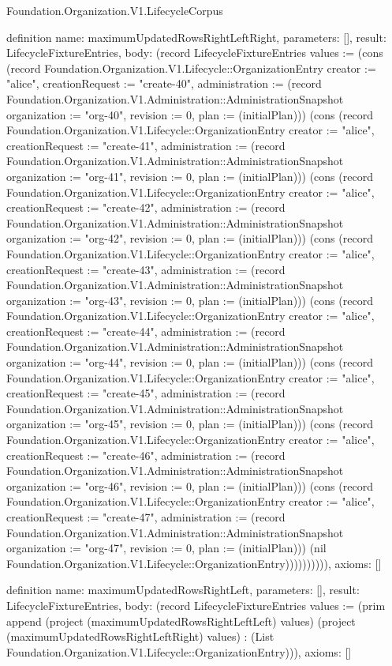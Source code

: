 \begin{lexlean}{Foundation.Organization.V1.LifecycleCorpus}
\begin{semanticmodule}
definition{
  name: maximumUpdatedRowsRightLeftRight,
  parameters: [],
  result: LifecycleFixtureEntries,
  body: (record LifecycleFixtureEntries {values := (cons (record Foundation.Organization.V1.Lifecycle::OrganizationEntry {creator := "alice", creationRequest := "create-40", administration := (record Foundation.Organization.V1.Administration::AdministrationSnapshot {organization := "org-40", revision := 0, plan := (initialPlan)})}) (cons (record Foundation.Organization.V1.Lifecycle::OrganizationEntry {creator := "alice", creationRequest := "create-41", administration := (record Foundation.Organization.V1.Administration::AdministrationSnapshot {organization := "org-41", revision := 0, plan := (initialPlan)})}) (cons (record Foundation.Organization.V1.Lifecycle::OrganizationEntry {creator := "alice", creationRequest := "create-42", administration := (record Foundation.Organization.V1.Administration::AdministrationSnapshot {organization := "org-42", revision := 0, plan := (initialPlan)})}) (cons (record Foundation.Organization.V1.Lifecycle::OrganizationEntry {creator := "alice", creationRequest := "create-43", administration := (record Foundation.Organization.V1.Administration::AdministrationSnapshot {organization := "org-43", revision := 0, plan := (initialPlan)})}) (cons (record Foundation.Organization.V1.Lifecycle::OrganizationEntry {creator := "alice", creationRequest := "create-44", administration := (record Foundation.Organization.V1.Administration::AdministrationSnapshot {organization := "org-44", revision := 0, plan := (initialPlan)})}) (cons (record Foundation.Organization.V1.Lifecycle::OrganizationEntry {creator := "alice", creationRequest := "create-45", administration := (record Foundation.Organization.V1.Administration::AdministrationSnapshot {organization := "org-45", revision := 0, plan := (initialPlan)})}) (cons (record Foundation.Organization.V1.Lifecycle::OrganizationEntry {creator := "alice", creationRequest := "create-46", administration := (record Foundation.Organization.V1.Administration::AdministrationSnapshot {organization := "org-46", revision := 0, plan := (initialPlan)})}) (cons (record Foundation.Organization.V1.Lifecycle::OrganizationEntry {creator := "alice", creationRequest := "create-47", administration := (record Foundation.Organization.V1.Administration::AdministrationSnapshot {organization := "org-47", revision := 0, plan := (initialPlan)})}) (nil Foundation.Organization.V1.Lifecycle::OrganizationEntry)))))))))}),
  axioms: []
}

definition{
  name: maximumUpdatedRowsRightLeft,
  parameters: [],
  result: LifecycleFixtureEntries,
  body: (record LifecycleFixtureEntries {values := (prim append (project (maximumUpdatedRowsRightLeftLeft) values) (project (maximumUpdatedRowsRightLeftRight) values) : (List Foundation.Organization.V1.Lifecycle::OrganizationEntry))}),
  axioms: []
}


\end{semanticmodule}
\end{lexlean}
